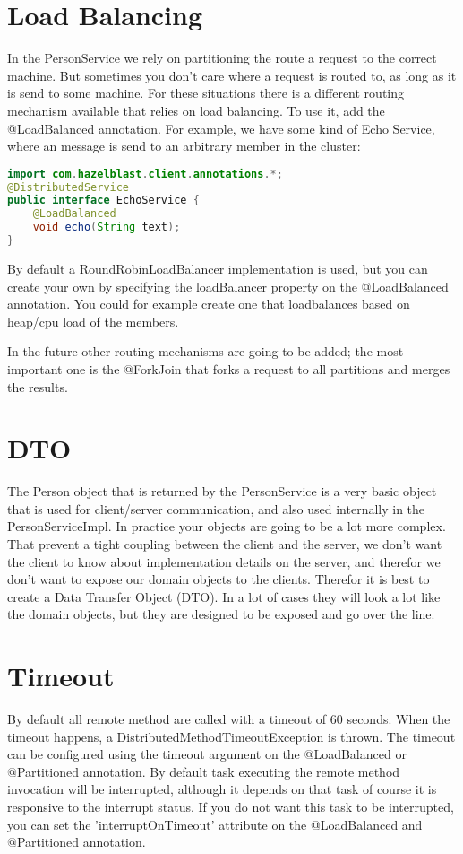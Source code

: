 \section{Load Balancing}
In the PersonService we rely on partitioning the route a request to the correct machine. But sometimes you don't care where a request is routed to, as long as it is send to some machine. For these situations there is a different routing mechanism available that relies on load balancing. To use it, add the @LoadBalanced annotation. For example, we have some kind of Echo Service, where an message is send to an arbitrary member in the cluster:
\begin{lstlisting}[language=java]
import com.hazelblast.client.annotations.*;
@DistributedService
public interface EchoService {
    @LoadBalanced
    void echo(String text);
}
\end{lstlisting}
By default a RoundRobinLoadBalancer implementation is used, but you can create your own by specifying the loadBalancer property on the @LoadBalanced annotation. You could for example create one that loadbalances based on heap/cpu load of the members. 

In the future other routing mechanisms are going to be added; the most important one is the @ForkJoin that forks a request to all partitions and merges the results.

\section{DTO}
The Person object that is returned by the PersonService is a very basic object that is used for client/server communication, and also used internally in the PersonServiceImpl. In practice your objects are going to be a lot more complex. That prevent a tight coupling between the client and the server, we don't want the client to know about implementation details on the server, and therefor we don't want to expose our domain objects to the clients. Therefor it is best to create a Data Transfer Object (DTO). In a lot of cases they will look a lot like the domain objects, but they are designed to be exposed and go over the line. 

\section{Timeout}
By default all remote method are called with a timeout of 60 seconds. When the timeout happens, a DistributedMethodTimeoutException is thrown. The timeout can be configured using the timeout argument on the @LoadBalanced or @Partitioned annotation. By default task executing the remote method invocation will be interrupted, although it depends on that task of course it is responsive to the interrupt status. If you do not want this task to be interrupted, you can set the 'interruptOnTimeout' attribute on the @LoadBalanced and @Partitioned annotation.

